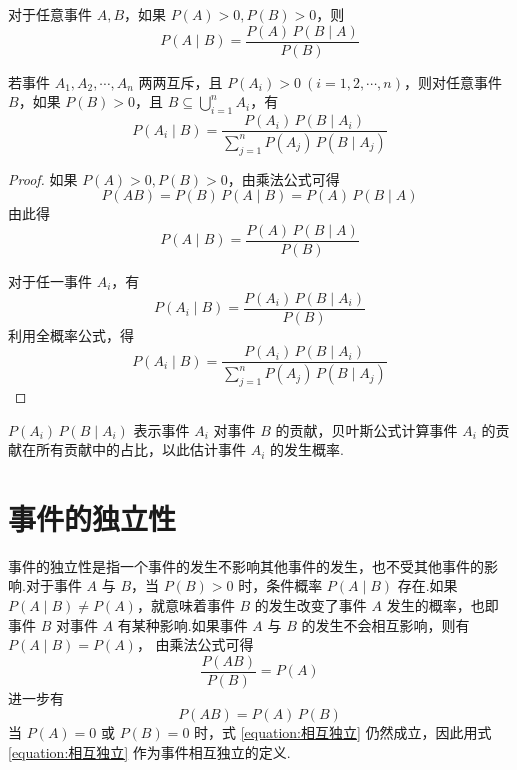 \begin{theorem}[][贝叶斯公式]
    \indent 对于任意事件 $A,B$，如果 $P(A)>0, P(B)>0$，则
    \begin{equation}
        P(A \mid B)=\dfrac{P(A) \, P(B \mid A)}{P(B)}
    \end{equation}

    若事件 $A_1,A_2,\cdots,A_n$ 两两互斥，且 $P(A_i)>0 \ (i=1,2,\cdots,n)$，则对任意事件 $B$，如果 $P(B)>0$，且 $B \subseteq \displaystyle\bigcup_{i=1}^n A_i$，有
    \begin{equation} \label{equation:bayes}
        P(A_i \mid B) = \dfrac{P(A_i) \, P(B \mid A_i)}{\displaystyle\sum_{j=1}^n P(A_j) \, P(B \mid A_j)}
    \end{equation}
\end{theorem}

\begin{proof}
    如果 $P(A)>0, P(B)>0$，由乘法公式可得
    $$
    P(AB) = P(B) \, P(A \mid B) = P(A) \, P(B \mid A)
    $$
    由此得
    $$
    P(A \mid B)=\dfrac{P(A) \, P(B \mid A)}{P(B)}
    $$

    对于任一事件 $A_i$，有
    $$
    P(A_i \mid B)=\dfrac{P(A_i) \, P(B \mid A_i)}{P(B)}
    $$
    利用全概率公式，得
    $$
    P(A_i \mid B) = \dfrac{P(A_i) \, P(B \mid A_i)}{\displaystyle\sum_{j=1}^n P(A_j) \, P(B \mid A_j)}
    $$
\end{proof}

\begin{note}
    \indent $P(A_i) \, P(B \mid A_i)$ 表示事件 $A_i$ 对事件 $B$ 的贡献，贝叶斯公式计算事件 $A_i$ 的贡献在所有贡献中的占比，以此估计事件 $A_i$ 的发生概率.
\end{note}

\section{事件的独立性}

事件的独立性是指一个事件的发生不影响其他事件的发生，也不受其他事件的影响.对于事件 $A$ 与 $B$，当 $P(B) > 0$ 时，条件概率 $P(A \mid B)$ 存在.如果 $P(A \mid B) \not= P(A)$，就意味着事件 $B$ 的发生改变了事件 $A$ 发生的概率，也即事件 $B$ 对事件 $A$ 有某种影响.如果事件 $A$ 与 $B$ 的发生不会相互影响，则有 $P(A \mid B) = P(A)$， 由乘法公式可得
$$
\dfrac{P(AB)}{P(B)} = P(A)
$$
进一步有
\begin{equation} \label{equation:相互独立}
    P(AB) = P(A) \, P(B)
\end{equation}
当 $P(A)=0$ 或 $P(B)=0$ 时，式 \eqref{equation:相互独立} 仍然成立，因此用式 \eqref{equation:相互独立} 作为事件相互独立的定义.

